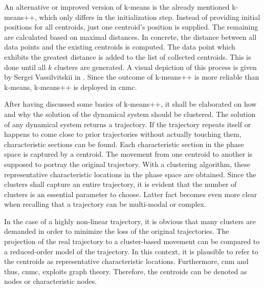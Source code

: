 An alternative or improved version of k-means is the already
mentioned k-means++, which
only differs in the initialization step. Instead of providing 
initial positions for all centroids, just one centroid's 
position is supplied. The remaining are calculated based on 
maximal distances. In concrete, the distance between all 
data points and the existing centroids is computed. The data point 
which exhibits the greatest distance is added to the 
list of collected centroids. This is done until all $k$ 
clusters are generated. A visual depiction of this process 
is given by Sergei Vassilvitskii in \cite{Sergei_Visual}.
Since the outcome of k-means++ is more reliable than 
k-means, k-means++ is deployed in \gls{cnmc}.\newline

After having discussed some basics of k-means++, it shall be 
elaborated on how and why the solution of the dynamical system should be 
clustered. The solution of any dynamical system returns a trajectory.
If the trajectory repeats itself or happens to come close 
to prior trajectories without actually touching them,  
characteristic sections can be found.
Each characteristic section in the phase space is 
captured by a centroid. The movement from one 
centroid to another is supposed to portray the original
trajectory. With a clustering algorithm, these representative 
characteristic locations in the phase space are obtained. 
Since the clusters shall capture an entire trajectory, it is 
evident that the number of clusters is an
essential parameter to choose. Latter fact becomes even 
more clear when recalling that a trajectory can be multi-modal or complex.\newline

In the case of a highly non-linear 
trajectory, it is obvious that many clusters are demanded in
order to minimize the loss of the original
trajectories. The projection of the real trajectory 
to a cluster-based movement can be compared to 
a reduced-order model of the trajectory. In this context, 
it is plausible to refer to the centroids as 
representative characteristic locations. Furthermore, \gls{cnm} and thus, \gls{cnmc}, exploits graph theory. 
Therefore, the centroids can be denoted as nodes or characteristic nodes.\newline


